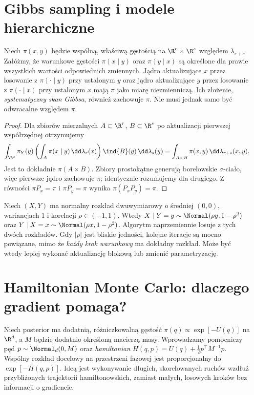\section{Gibbs sampling i modele hierarchiczne}
\begin{twierdzenie}
\label{thm:gibbs-invariant}
Niech $\pi(x,y)$ będzie wspólną, właściwą gęstością
na $\R^r\times\R^s$ względem $\lambda_{r+s}$.
Załóżmy, że warunkowe gęstości $\pi(x\mid y)$ oraz
$\pi(y\mid x)$ są określone dla prawie wszystkich
wartości odpowiednich zmiennych. Jądro aktualizujące
$x$ przez losowanie z $\pi(\cdot\mid y)$ przy
ustalonym $y$ oraz jądro aktualizujące $y$ przez
losowanie z $\pi(\cdot\mid x)$ przy ustalonym $x$
mają $\pi$ jako miarę niezmienniczą. Ich złożenie,
\emph{systematyczny skan Gibbsa}, również zachowuje $\pi$.
Nie musi jednak samo być odwracalne względem $\pi$.
\end{twierdzenie}
\begin{proof}
Dla zbiorów mierzalnych $A\subset\R^r$, $B\subset\R^s$
po aktualizacji pierwszej współrzędnej otrzymujemy
\[
 \int_{\R^s}\pi_Y(y)
 \left(\int_A\pi(x\mid y)\,\dd\lambda_r(x)\right)
 \ind{B}(y)\,\dd\lambda_s(y)
 =\int_{A\times B}\pi(x,y)\,\dd\lambda_{r+s}(x,y).
\]
Jest to dokładnie $\pi(A\times B)$. Zbiory prostokątne
generują borelowskie $\sigma$-ciało, więc pierwsze
jądro zachowuje $\pi$; identycznie rozumujemy dla drugiego.
Z równości $\pi P_x=\pi$ i $\pi P_y=\pi$
wynika $\pi(P_xP_y)=\pi$.
\end{proof}

\begin{przyklad}
Niech $(X,Y)$ ma normalny rozkład dwuwymiarowy o średniej
$(0,0)$, wariancjach $1$ i korelacji $\rho\in(-1,1)$.
Wtedy
$X\mid Y=y\sim\Normal(\rho y,1-\rho^2)$ oraz
$Y\mid X=x\sim\Normal(\rho x,1-\rho^2)$.
Algorytm naprzemiennie losuje z tych dwóch rozkładów.
Gdy $|\rho|$ jest bliskie jedności, kolejne iteracje
są mocno powiązane, mimo że \emph{każdy krok warunkowy}
ma dokładny rozkład. Może być wtedy lepiej wykonać
aktualizację blokową lub zmienić parametryzację.
\end{przyklad}

\section{Hamiltonian Monte Carlo: dlaczego gradient pomaga?}
\label{sec:hmc-intro}
Niech posterior ma dodatnią, różniczkowalną gęstość
$\pi(q)\propto\exp[-U(q)]$ na $\R^d$, a $M$
będzie dodatnio określoną macierzą masy. Wprowadzamy
pomocniczy pęd $p\sim\Normal_d(0,M)$ oraz
\emph{hamiltonian} $H(q,p)=U(q)+\frac12p^\top M^{-1}p$.
Wspólny rozkład docelowy na przestrzeni fazowej
jest proporcjonalny do $\exp[-H(q,p)]$.
Ideą jest wykonywanie długich, skorelowanych ruchów
wzdłuż przybliżonych trajektorii hamiltonowskich,
zamiast małych, losowych kroków bez informacji o gradiencie.

